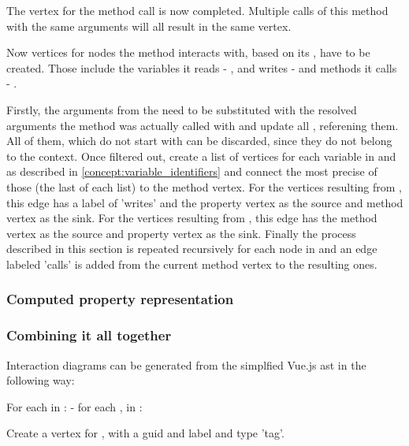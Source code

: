 The vertex for the method call is now completed. Multiple calls of this method with the same arguments will all result in the same vertex.

Now vertices for nodes the method interacts with, based on its , have to be created. Those include the variables it reads - , and writes -  and methods it calls - . 

Firstly, the arguments from the  need to be substituted with the resolved arguments the method was actually called with and update all ,    referening them. All of them, which do not start with  can be discarded, since they do not belong to the context. Once filtered out, create a list of vertices for each variable in  and  as described in \ref{concept:variable_identifiers} and connect the most precise of those (the last of each list) to the method vertex. For the vertices resulting from , this edge has a label of 'writes' and the property vertex as the source and method vertex as the sink. For the vertices resulting from , this edge has the method vertex as the source and property vertex as the sink. 
Finally the process described in this section is repeated recursively for each  node in  and an edge labeled 'calls' is added from the current method vertex to the resulting ones. 

\subsubsection{Computed property representation}
\label{concept:computed_property}


\subsubsection{Combining it all together}

Interaction diagrams can be generated from the simplfied Vue.js \gls{ast} in the following way:

For each  in :
- for each ,   in :

Create a vertex for , with a \gls{guid}  and label  and type 'tag'.

